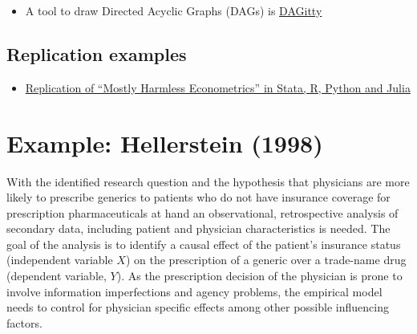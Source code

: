 \documentclass[
]{book}
\providecommand{\tightlist}{%
  \setlength{\itemsep}{0pt}\setlength{\parskip}{0pt}}
\begin{document}
\begin{itemize}
\tightlist
\item
  A tool to draw Directed Acyclic Graphs (DAGs) is
  \href{http://www.dagitty.net/}{DAGitty}
\end{itemize}

\hypertarget{replication-examples}{%
\subsection{Replication examples}\label{replication-examples}}

\begin{itemize}
\tightlist
\item
  \href{https://github.com/vikjam/mostly-harmless-replication}{Replication
  of ``Mostly Harmless Econometrics'' in Stata, R, Python and Julia}
\end{itemize}

\hypertarget{example-hellerstein-1998-1}{%
\section{Example: Hellerstein (1998)}\label{example-hellerstein-1998-1}}

With the identified research question and the hypothesis that physicians
are more likely to prescribe generics to patients who do not have
insurance coverage for prescription pharmaceuticals at hand an
observational, retrospective analysis of secondary data, including
patient and physician characteristics is needed. The goal of the
analysis is to identify a causal effect of the patient's insurance
status (independent variable \(X\)) on the prescription of a generic
over a trade-name drug (dependent variable, \(Y\)). As the prescription
decision of the physician is prone to involve information imperfections
and agency problems, the empirical model needs to control for physician
specific effects among other possible influencing factors.
\end{document}
